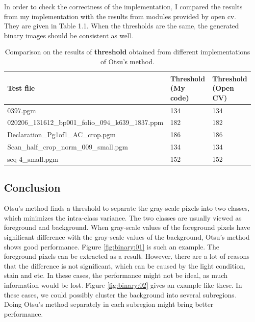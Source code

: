 \documentclass[paper=a4, fontsize=11pt]{scrartcl}
\numberwithin{equation}{section}		%
\numberwithin{figure}{section}			%
\numberwithin{table}{section}				%
\begin{document}
In order to check the correctness of the implementation, I compared the results from my implementation with the results from modules provided by open cv.
They are given in Table 1.1. %
When the thresholds are the same, the generated binary images should be consistent as well.
\begin{table}
\label{tab:binary_comp}
\caption {Comparison on the results of \textbf{threshold} obtained from different implementations of Otsu's method.}
\begin{center}
\begin{tabular}{ | l | l | l | }
\hline
Test file & Threshold (My code) & Threshold (Open CV)  \\ \hline
0397.pgm                                          & 134 & 134 \\ \hline
020206\_131612\_bp001\_folio\_094\_k639\_1837.ppm & 182 & 182 \\ \hline
Declaration\_Pg1of1\_AC\_crop.pgm                 & 186 & 186 \\ \hline
Scan\_half\_crop\_norm\_009\_small.pgm            & 134 & 134 \\ \hline
seq-4\_small.pgm                                  & 152 & 152 \\ \hline
\end{tabular}
\end{center}
\end{table}

\subsection{Conclusion}

Otsu's method finds a threshold to separate the gray-scale pixels into two classes, which minimizes the intra-class variance.
The two classes are usually viewed as foreground and background.
When gray-scale values of the foreground pixels have significant difference with the gray-scale values of the background, Otsu's method shows good performance.
Figure \ref{fig:binary:01} is such an example.
The foreground pixels can be extracted as a result.
However, there are a lot of reasons that the difference is not significant, which can be caused by the light condition, stain and etc.
In these cases, the performance might not be ideal, as much information would be lost.
Figure \ref{fig:binary:02} gives an example like these.
In these cases, we could possibly cluster the background into several subregions.
Doing Otsu's method separately in each subregion might bring better performance.
\end{document}

